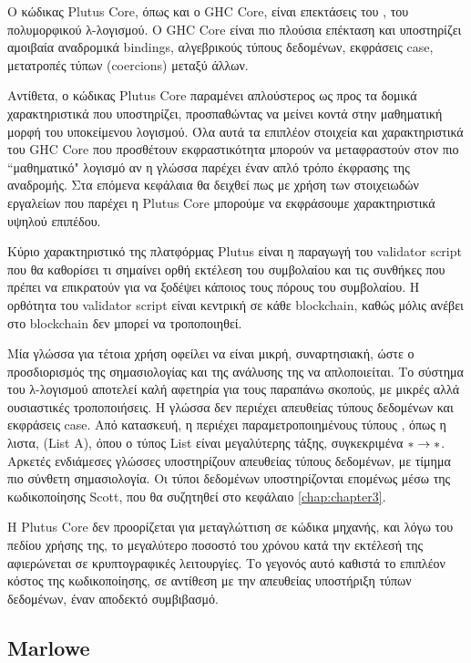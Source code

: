 Ο κώδικας Plutus Core, όπως και ο GHC Core, είναι επεκτάσεις του \FOM{}, του
πολυμορφικού λ-λογισμού.  Ο GHC Core είναι πιο πλούσια επέκταση και υποστηρίζει
αμοιβαία αναδρομικά bindings, αλγεβρικούς τύπους δεδομένων, εκφράσεις case,
μετατροπές τύπων (coercions) μεταξύ άλλων.

Αντίθετα, ο κώδικας Plutus Core παραμένει απλούστερος ως προς τα δομικά
χαρακτηριστικά που υποστηρίζει, προσπαθώντας να μείνει κοντά στην μαθηματική
μορφή του υποκείμενου λογισμού.  Όλα αυτά τα επιπλέον στοιχεία και
χαρακτηριστικά του GHC Core που προσθέτουν εκφραστικότητα μπορούν να
μεταφραστούν στον πιο ``μαθηματικό" λογισμό αν η γλώσσα παρέχει έναν απλό τρόπο
έκφρασης της αναδρομής. Στα επόμενα κεφάλαια θα δειχθεί πως με χρήση των
στοιχειωδών εργαλείων που παρέχει η Plutus Core μπορούμε να εκφράσουμε
χαρακτηριστικά υψηλού επιπέδου.

Κύριο χαρακτηριστικό της πλατφόρμας Plutus είναι η παραγωγή του validator
script που θα καθορίσει τι σημαίνει ορθή εκτέλεση του συμβολαίου και τις
συνθήκες που πρέπει να επικρατούν για να ξοδέψει κάποιος τους πόρους του
συμβολαίου. Η ορθότητα του validator script είναι κεντρική σε κάθε blockchain,
καθώς μόλις ανέβει στο blockchain δεν μπορεί να τροποποιηθεί.

Μία γλώσσα για τέτοια χρήση οφείλει να είναι μικρή, συναρτησιακή, ώστε ο
προσδιορισμός της σημασιολογίας και της ανάλυσης της να απλοποιείται. Το
σύστημα του λ-λογισμού \FOM{} αποτελεί καλή αφετηρία για τους παραπάνω σκοπούς,
με μικρές αλλά ουσιαστικές τροποποιήσεις. Η γλώσσα δεν περιέχει απευθείας
τύπους δεδομένων και εκφράσεις case. Από κατασκευή, η \FOM{} περιέχει
παραμετροποιημένους τύπους , όπως η λιστα, (List A), όπου ο τύπος List είναι
μεγαλύτερης τάξης, συγκεκριμένα $\operatorname{\ast} \rightarrow \operatorname{\ast}$. Αρκετές ενδιάμεσες
γλώσσες υποστηρίζουν απευθείας τύπους δεδομένων, με τίμημα πιο σύνθετη
σημασιολογία. Οι τύποι δεδομένων υποστηρίζονται επομένως μέσω της κωδικοποίησης
Scott, που θα συζητηθεί στο κεφάλαιο \ref{chap:chapter3}.

Η Plutus Core δεν προορίζεται για μεταγλώττιση σε κώδικα μηχανής, και λόγω του
πεδίου χρήσης της, το μεγαλύτερο ποσοστό του χρόνου κατά την εκτέλεσή της
αφιερώνεται σε κρυπτογραφικές λειτουργίες. Το γεγονός αυτό καθιστά το επιπλέον
κόστος της κωδικοποίησης, σε αντίθεση με την απευθείας υποστήριξη τύπων
δεδομένων, έναν αποδεκτό συμβιβασμό.

\subsection{Marlowe}

